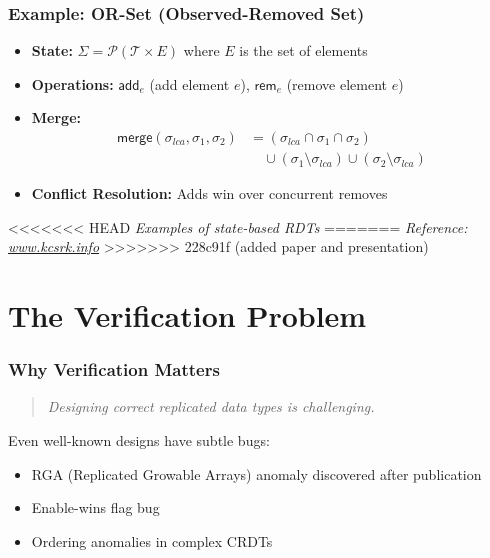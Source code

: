 \documentclass[usepdftitle=false]{beamer}
\newcommand{\F}[1]{\mathsf{#1}}
\begin{document}
\begin{frame}
  \frametitle{Example: OR-Set (Observed-Removed Set)}
  
  \small
  \begin{itemize}
    \item \textbf{State:} $\Sigma = \mathcal{P}(\mathcal{T} \times E)$ where $E$ is the set of elements
    \item \textbf{Operations:} $\F{add}_e$ (add element $e$), $\F{rem}_e$ (remove element $e$)
    \item \textbf{Merge:}
    \begin{align*}
      \F{merge}(\sigma_{lca}, \sigma_1, \sigma_2) &= (\sigma_{lca} \cap \sigma_1 \cap \sigma_2) \\
      &\quad \cup (\sigma_1 \setminus \sigma_{lca}) \cup (\sigma_2 \setminus \sigma_{lca})
    \end{align*}
    \item \textbf{Conflict Resolution:} Adds win over concurrent removes
  \end{itemize}
  
  \vspace{0.3cm}
<<<<<<< HEAD
  \small\textit{Examples of state-based RDTs}
=======
  \small\textit{Reference: \url{www.kcsrk.info}}
>>>>>>> 228c91f (added paper and presentation)
\end{frame}

\section{The Verification Problem}

\begin{frame}
  \frametitle{Why Verification Matters}
  
  \begin{quote}
    \textit{Designing correct replicated data types is challenging.}
  \end{quote}
  
  \vspace{0.3cm}
  Even well-known designs have subtle bugs:
  \begin{itemize}
    \item RGA (Replicated Growable Arrays) anomaly discovered after publication
    \item Enable-wins flag bug
    \item Ordering anomalies in complex CRDTs
  \end{itemize}
\end{frame}
\end{document}
